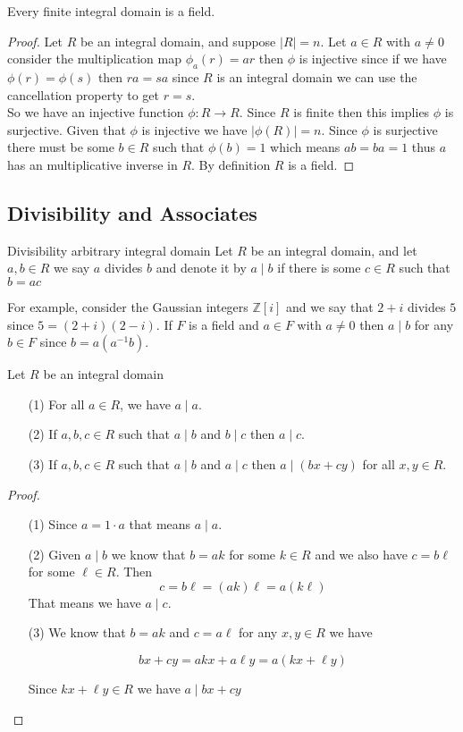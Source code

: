 \documentclass[16pt,a4paper]{article}
\theoremstyle{definition}
\begin{document}
\newpage
\begin{thm}{}{}
Every finite integral domain is a field.
\end{thm}

\begin{proof}
Let $R$ be an integral domain, and suppose $|R|=n$. Let $a\in R$ with $a\neq 0$ consider the multiplication map $\phi_a(r) = ar$ then $\phi$ is injective since if we have $\phi(r)=\phi(s)$ then $ra=sa$ since $R$ is an integral domain we can use the cancellation property to get $r=s$.
\\
So we have an injective function $\phi:R\rightarrow R$. Since $R$ is finite then this implies $\phi$ is surjective. Given that $\phi$ is injective we have $|\phi(R)|=n$. Since $\phi$ is surjective there must be some $b\in R$ such that $\phi(b) = 1$ which means $ab=ba = 1$ thus $a$ has an multiplicative inverse in $R$. By definition $R$ is a field.  
\end{proof}


\subsection{Divisibility and Associates}
\begin{defn}{Divisibility arbitrary integral domain}{}
Let $R$ be an integral domain, and let $a,b\in R$ we say $a$ divides $b$ and denote it by $a\mid b$ if there is some $c\in R$ such that $b=ac$
\end{defn}
For example, consider the Gaussian integers $\mathbb{Z}[i]$ and we say that $2+i$ divides $5$ since $5=(2+i)(2-i)$. If $F$ is a field and $a\in F$ with $a\neq 0$ then $a\mid b$ for any $b\in F$ since $b=a(a^{-1}b)$. 

\begin{prop}{}{}\label{prop1}
Let $R$ be an integral domain
\begin{itemize}
\item[(1)] For all $a\in R$, we have $a\mid a$. 
\item[(2)] If $a,b,c\in R$ such that $a\mid b$ and $b\mid c$ then $a\mid c$. 
\item[(3)] If $a,b,c\in R$ such that $a\mid b$ and $a\mid c$ then $a\mid (bx+cy)$ for all $x,y\in R$. 
\end{itemize}
\end{prop}
\begin{proof}
\begin{itemize}
\item[(1)] Since $a=1\cdot a$ that means $a\mid a$. 


\item[(2)] Given $a\mid b$ we know that $b=ak$ for some $k\in R$ and we also have $c=b\ell$ for some $\ell \in R$. Then 
\[c=b\ell = (ak)\ell = a(k\ell)\]
That means we have $a\mid c$. 

\item[(3)] We know that $b=ak$ and $c=a\ell$ for any $x,y\in R$ we have 

\[bx+cy = akx+a\ell y = a(kx+\ell y)\]

Since $kx+\ell y\in R$ we have $a\mid bx+cy$
\end{itemize}
\end{proof}
\newpage
\end{document}
